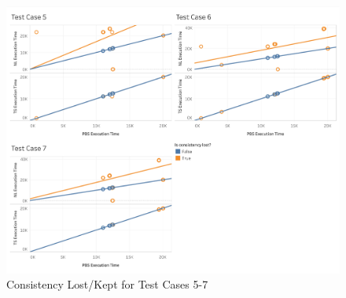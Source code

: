 \begin{figure}
\centering
\includegraphics[scale=0.40]{images/Dashboard2_TL.png}
\caption{Consistency Lost/Kept for Test Cases 5-7}
\label{results:consistency_test_case_graphs_5_7}
\end{figure}